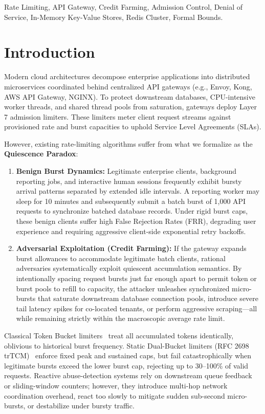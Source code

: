 \documentclass[conference]{IEEEtran}
\begin{document}
\begin{IEEEkeywords}
Rate Limiting, API Gateway, Credit Farming, Admission Control, Denial of Service, In-Memory Key-Value Stores, Redis Cluster, Formal Bounds.
\end{IEEEkeywords}

\section{Introduction}

Modern cloud architectures decompose enterprise applications into distributed microservices coordinated behind centralized API gateways (e.g., Envoy, Kong, AWS API Gateway, NGINX). To protect downstream databases, CPU-intensive worker threads, and shared thread pools from saturation, gateways deploy Layer 7 admission limiters. These limiters meter client request streams against provisioned rate and burst capacities to uphold Service Level Agreements (SLAs).

However, existing rate-limiting algorithms suffer from what we formalize as the \textbf{Quiescence Paradox}:
\begin{enumerate}
    \item \textbf{Benign Burst Dynamics:} Legitimate enterprise clients, background reporting jobs, and interactive human sessions frequently exhibit bursty arrival patterns separated by extended idle intervals. A reporting worker may sleep for 10 minutes and subsequently submit a batch burst of 1,000 API requests to synchronize batched database records. Under rigid burst caps, these benign clients suffer high False Rejection Rates (FRR), degrading user experience and requiring aggressive client-side exponential retry backoffs.
    \item \textbf{Adversarial Exploitation (Credit Farming):} If the gateway expands burst allowances to accommodate legitimate batch clients, rational adversaries systematically exploit quiescent accumulation semantics. By intentionally spacing request bursts just far enough apart to permit token or burst pools to refill to capacity, the attacker unleashes synchronized micro-bursts that saturate downstream database connection pools, introduce severe tail latency spikes for co-located tenants, or perform aggressive scraping---all while remaining strictly within the macroscopic average rate limit.
\end{enumerate}

Classical Token Bucket limiters~\cite{turner1986new,rfc2212} treat all accumulated tokens identically, oblivious to historical burst frequency. Static Dual-Bucket limiters (RFC 2698 trTCM)~\cite{rfc2698} enforce fixed peak and sustained caps, but fail catastrophically when legitimate bursts exceed the lower burst cap, rejecting up to 30--100\% of valid requests. Reactive abuse-detection systems rely on downstream queue feedback~\cite{nichols2012controlling} or sliding-window counters; however, they introduce multi-hop network coordination overhead, react too slowly to mitigate sudden sub-second micro-bursts, or destabilize under bursty traffic.
\end{document}
